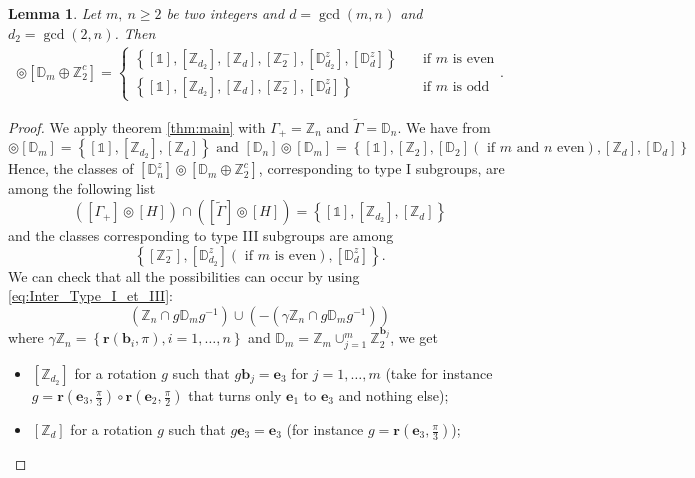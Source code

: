 \documentclass[11pt,a4paper]{amsart}
\newtheorem{lem}[thm]{Lemma}
\theoremstyle{definition}
\newcommand{\ZZ}{\mathbb{Z}}                %
\newcommand{\DD}{\mathbb{D}}                %
\newcommand{\1}{\mathds{1}}		            %
\newcommand{\ee}{\pmb{e}}                   %
\newcommand{\vR}{\mathbf{r}}
\newcommand{\bb}{\mathbf{b}}
\newcommand{\set}[1]{\left\{#1\right\}}     %
\begin{document}
\begin{lem}\label{lem:DnvClipsDm}
  Let $m,\ n \geq 2$ be two integers and $d=\gcd(m,n)$ and $d_2=\gcd(2,n)$. Then
  \begin{align*}
    [\DD_n^z]\circledcirc [\DD_m\oplus \ZZ_2^c]=
    \begin{cases}
      \set{[\1],[\ZZ_{d_2}],[\ZZ_d],[\ZZ_2^-],[\DD_{d_2}^z],[\DD_d^z]} \quad & \text{if $m$ is even} \\
      \set{[\1],[\ZZ_{d_2}],[\ZZ_d],[\ZZ_2^-],[\DD_d^z]} \quad   & \text{if $m$ is odd}
    \end{cases} .
  \end{align*}
\end{lem}
\begin{proof}
We apply theorem \ref{thm:main} with $\Gamma_+=\ZZ_n$ and $\tilde{\Gamma}=\DD_n$. We have from \cite[table 1]{Olive2019}
\begin{equation*}
[\ZZ_n]\circledcirc [\DD_m]=\set{[\1],[\ZZ_{d_2}],[\ZZ_d]} \text{ and }
[\DD_n]\circledcirc [\DD_m]=\set{[\1],[\ZZ_2],[\DD_2] (\text{ if $m$ and $n$ even}),[\ZZ_d],[\DD_d]}
\end{equation*}
Hence, the classes of $[\DD_n^z]\circledcirc [\DD_m\oplus \ZZ_2^c]$, corresponding to type I subgroups, are among the following list 
	 \begin{equation*}
([\Gamma_+]\circledcirc [H])\cap ([\tilde{\Gamma}]\circledcirc[H])=\set{[\1],[\ZZ_{d_2}],[\ZZ_d]}
	 \end{equation*}
	 and the classes corresponding to type III subgroups are among
	 \begin{equation*}
	 \set{[\ZZ_2^-],[\DD_{d_2}^z] (\text{ if $m$ is even}),[\DD_d^z]}.
	 \end{equation*}
	 We can check that all the possibilities can occur by using \eqref{eq:Inter_Type_I_et_III}:
	 \begin{equation*}
	 	 (\ZZ_n\cap g \DD_m g^{-1})\cup (-(\gamma\ZZ_n\cap g \DD_m g^{-1}))
	 \end{equation*}
 where $ \gamma\ZZ_n=\set{\vR(\bb_i,\pi),i=1,\dotsc,n}$ and $\DD_m=\ZZ_m \cup_{j=1}^{m} \ZZ_2^{\bb_j}$,
 we get
	 \begin{itemize}
	 	\item $[\ZZ_{d_2}]$ for a rotation $g$ such that $g\bb_j= \ee_3$ for $j=1,\dotsc,m$ (take for instance $g=\vR\left(\ee_3,\frac{\pi}{3}\right)\circ\vR\left(\ee_2,\frac{\pi}{2}\right)$ that turns only $\ee_1$ to $\ee_3$ and nothing else);
	 	\item $[\ZZ_d]$ for a rotation $g$ such that $g\ee_3= \ee_3$ (for instance $g=\vR\left(\ee_3,\frac{\pi}{3}\right)$);

\end{itemize}
\end{proof}
\end{document}
